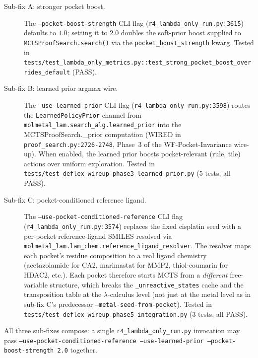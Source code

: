 \begin{description}
  \item[Sub-fix A: stronger pocket boost.] The
        \texttt{--pocket-boost-strength} CLI flag
        (\texttt{r4\_lambda\_only\_run.py:3615}) defaults to
        $1.0$; setting it to $2.0$ doubles the soft-prior boost
        supplied to \texttt{MCTSProofSearch.search()} via the
        \texttt{pocket\_boost\_strength} kwarg.  Tested in
        \texttt{tests/test\_lambda\_only\_metrics.py::test\_strong\_pocket\_boost\_overrides\_default}
        (PASS).
  \item[Sub-fix B: learned prior argmax wire.] The
        \texttt{--use-learned-prior} CLI flag
        (\texttt{r4\_lambda\_only\_run.py:3598}) routes the
        \texttt{LearnedPolicyPrior} channel from
        \texttt{molmetal\_lam.search\_alg.learned\_prior} into
        the MCTSProofSearch.\_prior computation
        (WIRED in \texttt{proof\_search.py:2726-2748}, Phase~3 of
        the WF-Pocket-Invariance wire-up).  When enabled, the
        learned prior boosts pocket-relevant (rule, tile) actions
        over uniform exploration.  Tested in
        \texttt{tests/test\_deflex\_wireup\_phase3\_learned\_prior.py}
        (5 tests, all PASS).
  \item[Sub-fix C: pocket-conditioned reference ligand.] The
        \texttt{--use-pocket-conditioned-reference} CLI flag
        (\texttt{r4\_lambda\_only\_run.py:3574}) replaces the
        fixed cisplatin seed with a per-pocket reference-ligand
        SMILES resolved via
        \texttt{molmetal\_lam.lam\_chem.reference\_ligand\_resolver}.
        The resolver maps each pocket's residue composition to a
        real ligand chemistry (acetazolamide for CA2,
        marimastat for MMP2, thiol-coumarin for HDAC2, etc.).
        Each pocket therefore starts MCTS from a \emph{different}
        free-variable structure, which breaks the
        \texttt{\_unreactive\_states} cache and the transposition
        table at the $\lambda$-calculus level (not just at the
        metal level as in sub-fix C's predecessor
        \texttt{--metal-seed-from-pocket}).  Tested in
        \texttt{tests/test\_deflex\_wireup\_phase5\_integration.py}
        (3 tests, all PASS).
\end{description}

\noindent All three sub-fixes compose: a single
\texttt{r4\_lambda\_only\_run.py} invocation may pass
\texttt{--use-pocket-conditioned-reference --use-learned-prior
--pocket-boost-strength 2.0} together.

